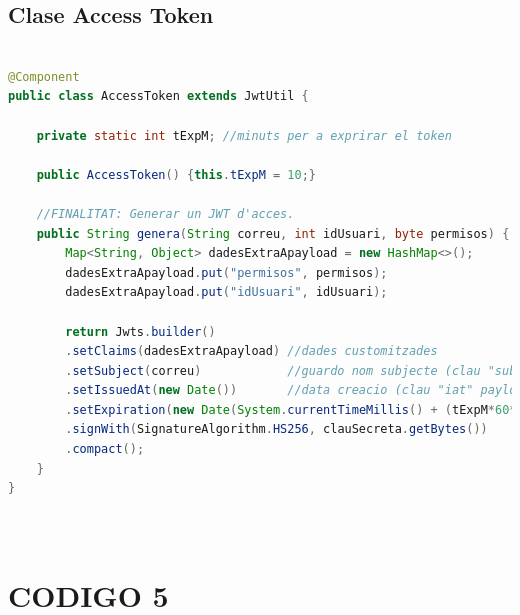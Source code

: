 \documentclass[a4paper,12pt]{report}
\begin{document}
\subsection{Clase Access Token}
\begin{lstlisting}[language=Java, basicstyle=\ttfamily\tiny, keywordstyle=\color{magenta}]

@Component
public class AccessToken extends JwtUtil {
	
	private static int tExpM; //minuts per a exprirar el token
	
	public AccessToken() {this.tExpM = 10;}
	
	//FINALITAT: Generar un JWT d'acces.
	public String genera(String correu, int idUsuari, byte permisos) {
		Map<String, Object> dadesExtraApayload = new HashMap<>();
		dadesExtraApayload.put("permisos", permisos);
		dadesExtraApayload.put("idUsuari", idUsuari);
		
		return Jwts.builder()
		.setClaims(dadesExtraApayload) //dades customitzades
		.setSubject(correu)            //guardo nom subjecte (clau "sub")
		.setIssuedAt(new Date())       //data creacio (clau "iat" payload)
		.setExpiration(new Date(System.currentTimeMillis() + (tExpM*60*1000)))
		.signWith(SignatureAlgorithm.HS256, clauSecreta.getBytes())
		.compact();
	}
}
	
				
\end{lstlisting}
	

	
		\section{CODIGO 5}
		\label{sec:KLNASQOW}
	

		


		
	
		
	

	\endgroup
\end{document}
